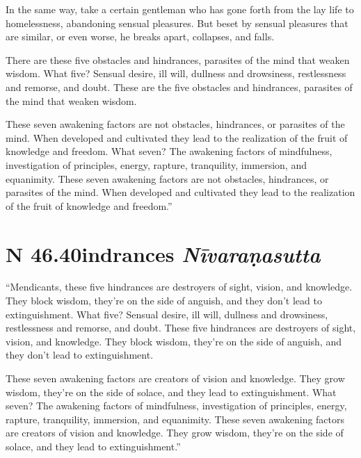 \documentclass[12pt,openany]{book}%
\newcommand*{\suttatitleacronym}[1]{\smaller[2]{#1}\vspace*{.3em}}
\newcommand*{\suttatitletranslation}[1]{\linebreak{#1}}
\newcommand*{\suttatitleroot}[1]{\linebreak\smaller[2]\itshape{#1}}
\newcommand*{\tocacronym}[1]{\hspace*{-3.3em}{#1}\quad}
\newcommand*{\toctranslation}[1]{#1}
\newcommand*{\tocroot}[1]{(\textit{#1})}
\begin{document}
In the same way, take a certain gentleman who has gone forth from the lay life to homelessness, abandoning sensual pleasures. But beset by sensual pleasures that are similar, or even worse, he breaks apart, collapses, and falls. 

There are these five obstacles and hindrances, parasites of the mind that weaken wisdom. What five? Sensual desire, ill will, dullness and drowsiness, restlessness and remorse, and doubt. These are the five obstacles and hindrances, parasites of the mind that weaken wisdom. 

These seven awakening factors are not obstacles, hindrances, or parasites of the mind. When developed and cultivated they lead to the realization of the fruit of knowledge and freedom. What seven? The awakening factors of mindfulness, investigation of principles, energy, rapture, tranquility, immersion, and equanimity. These seven awakening factors are not obstacles, hindrances, or parasites of the mind. When developed and cultivated they lead to the realization of the fruit of knowledge and freedom.” 

%
\section*{{\suttatitleacronym SN 46.40}{\suttatitletranslation Hindrances }{\suttatitleroot Nīvaraṇasutta}}
\addcontentsline{toc}{section}{\tocacronym{SN 46.40} \toctranslation{Hindrances } \tocroot{Nīvaraṇasutta}}

“Mendicants, these five hindrances are destroyers of sight, vision, and knowledge. They block wisdom, they’re on the side of anguish, and they don’t lead to extinguishment. What five? Sensual desire, ill will, dullness and drowsiness, restlessness and remorse, and doubt. These five hindrances are destroyers of sight, vision, and knowledge. They block wisdom, they’re on the side of anguish, and they don’t lead to extinguishment. 

These seven awakening factors are creators of vision and knowledge. They grow wisdom, they’re on the side of solace, and they lead to extinguishment. What seven? The awakening factors of mindfulness, investigation of principles, energy, rapture, tranquility, immersion, and equanimity. These seven awakening factors are creators of vision and knowledge. They grow wisdom, they’re on the side of solace, and they lead to extinguishment.” 
\end{document}
